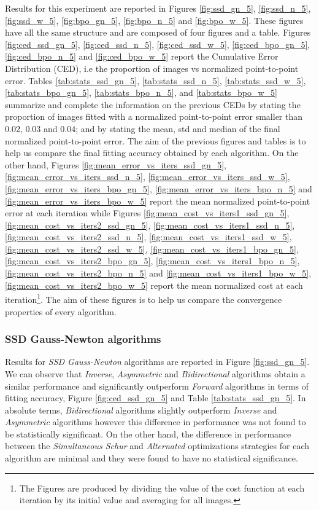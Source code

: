 Results for this experiment are reported in Figures \ref{fig:ssd_gn_5}, \ref{fig:ssd_n_5}, \ref{fig:ssd_w_5}, \ref{fig:bpo_gn_5}, \ref{fig:bpo_n_5} and \ref{fig:bpo_w_5}. These figures have all the same structure and are composed of four figures and a table. Figures \ref{fig:ced_ssd_gn_5}, \ref{fig:ced_ssd_n_5}, \ref{fig:ced_ssd_w_5}, \ref{fig:ced_bpo_gn_5}, \ref{fig:ced_bpo_n_5} and \ref{fig:ced_bpo_w_5} report the Cumulative Error Distribution (CED), i.e the proportion of images vs normalized point-to-point error. Tables \ref{tab:stats_ssd_gn_5}, \ref{tab:stats_ssd_n_5}, \ref{tab:stats_ssd_w_5}, \ref{tab:stats_bpo_gn_5}, \ref{tab:stats_bpo_n_5}, and \ref{tab:stats_bpo_w_5} summarize and complete the information on the previous CEDs by stating the proportion of images fitted with a normalized point-to-point error smaller than $0.02$, $0.03$ and $0.04$; and by stating the mean, std and median of the final normalized point-to-point error. The aim of the previous figures and tables is to help us compare the final fitting accuracy obtained by each algorithm. On the other hand, Figures \ref{fig:mean_error_vs_iters_ssd_gn_5}, \ref{fig:mean_error_vs_iters_ssd_n_5}, \ref{fig:mean_error_vs_iters_ssd_w_5}, \ref{fig:mean_error_vs_iters_bpo_gn_5}, \ref{fig:mean_error_vs_iters_bpo_n_5} and \ref{fig:mean_error_vs_iters_bpo_w_5} report the mean normalized point-to-point error at each iteration while Figures \ref{fig:mean_cost_vs_iters1_ssd_gn_5}, \ref{fig:mean_cost_vs_iters2_ssd_gn_5}, \ref{fig:mean_cost_vs_iters1_ssd_n_5}, \ref{fig:mean_cost_vs_iters2_ssd_n_5}, \ref{fig:mean_cost_vs_iters1_ssd_w_5}, \ref{fig:mean_cost_vs_iters2_ssd_w_5}, \ref{fig:mean_cost_vs_iters1_bpo_gn_5}, \ref{fig:mean_cost_vs_iters2_bpo_gn_5}, \ref{fig:mean_cost_vs_iters1_bpo_n_5}, \ref{fig:mean_cost_vs_iters2_bpo_n_5} and \ref{fig:mean_cost_vs_iters1_bpo_w_5}, \ref{fig:mean_cost_vs_iters2_bpo_w_5} report the mean normalized cost at each iteration\footnote{The Figures are produced by dividing the value of the cost function at each iteration by its initial value and averaging for all images.}. The aim of these figures is to help us compare the convergence properties of every algorithm.


\subsubsection{SSD Gauss-Newton algorithms}

Results for \emph{SSD Gauss-Newton} algorithms are reported in Figure \ref{fig:ssd_gn_5}. We can observe that \emph{Inverse}, \emph{Asymmetric} and \emph{Bidirectional} algorithms obtain a similar performance and significantly outperform \emph{Forward} algorithms in terms of fitting accuracy, Figure \ref{fig:ced_ssd_gn_5} and Table \ref{tab:stats_ssd_gn_5}. In absolute terms, \emph{Bidirectional} algorithms slightly outperform \emph{Inverse} and \emph{Asymmetric} algorithms however this difference in performance was not found to be statistically significant. On the other hand, the difference in performance between the \emph{Simultaneous Schur} and \emph{Alternated} optimizations strategies for each algorithm are minimal and they were found to have no statistical significance.

